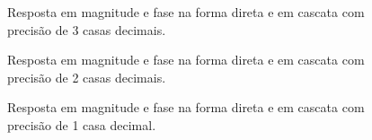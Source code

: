 \documentclass[12pt]{article}
\begin{document}
\begin{figure}[H]
\caption{Resposta em magnitude e fase na forma direta e em cascata com precis\~ao de 3 casas decimais.}
\label{casdir2}
\end{figure}

\begin{figure}[H]
\caption{Resposta em magnitude e fase na forma direta e em cascata com precis\~ao de 2 casas decimais.}
\label{casdir3}
\end{figure}

\begin{figure}[H]
\caption{Resposta em magnitude e fase na forma direta e em cascata com precis\~ao de 1 casa decimal.}
\label{casdir4}
\end{figure}
\end{document}
